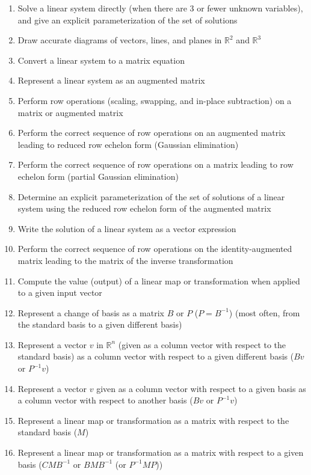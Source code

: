 \documentclass[10pt]{article}
\begin{document}
\begin{enumerate}
\itemsep0em
\item{Solve a linear system directly (when there are 3 or fewer unknown variables), and give an explicit parameterization of the set of solutions}
\item{Draw accurate diagrams of vectors, lines, and planes in $\mathbb{R}^2$ and $\mathbb{R}^3$}
\item{Convert a linear system to a matrix equation}
\item{Represent a linear system as an augmented matrix}
\item{Perform row operations (scaling, swapping, and in-place subtraction) on a matrix or augmented matrix}
\item{Perform the correct sequence of row operations on an augmented matrix leading to reduced row echelon form (Gaussian elimination)}
\item{Perform the correct sequence of row operations on a matrix leading to row echelon form (partial Gaussian elimination)}
\item{Determine an explicit parameterization of the set of solutions of a linear system using the reduced row echelon form of the augmented matrix}
\item{Write the solution of a linear system as a vector expression}
\item{Perform the correct sequence of row operations on the identity-augmented matrix leading to the matrix of the inverse transformation}
\item{Compute the value (output) of a linear map or transformation when applied to a given input vector}
\item{Represent a change of basis as a matrix $B$ or $P$ ($P=B^{-1}$) (most often, from the standard basis to a given different basis)}
\item{Represent a vector $v$ in $\mathbb{R}^n$ (given as a column vector with respect to the standard basis) as a column vector with respect to a given different basis ($Bv$ or $P^{-1}v$)}
\item{Represent a vector $v$ given as a column vector with respect to a given basis as a column vector with respect to another basis ($Bv$ or $P^{-1}v$)}
\item{Represent a linear map or transformation as a matrix with respect to the standard basis ($M$)}
\item{Represent a linear map or transformation as a matrix with respect to a given basis ($CMB^{-1}$ or $BMB^{-1}$ (or $P^{-1}MP$))}

\end{enumerate}
\end{document}
